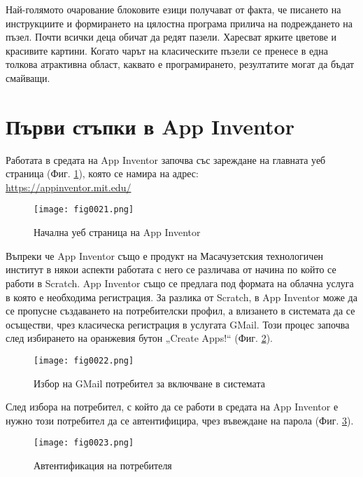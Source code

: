 Най-голямото очарование блоковите езици получават от факта, че писането на инструкциите и формирането на цялостна програма прилича на подреждането на пъзел. Почти всички деца обичат да редят пазели. Харесват ярките цветове и красивите картини. Когато чарът на класическите пъзели се пренесе в една толкова атрактивна област, каквато е програмирането, резултатите могат да бъдат смайващи. 

\section{Първи стъпки в App Inventor}

Работата в средата на App Inventor започва със зареждане на главната уеб страница (Фиг. \ref{fig0021}), която се намира на адрес: \\ \href{https://appinventor.mit.edu/}{https://appinventor.mit.edu/}

\begin{figure}[H]
  \centering
  \texttt{[image: fig0021.png]}
  \caption{Начална уеб страница на App Inventor}
\label{fig0021}
\end{figure}

Въпреки че App Inventor също е продукт на Масачузетския технологичен институт в някои аспекти работата с него се различава от начина по който се работи в Scratch. App Inventor също се предлага под формата на облачна услуга в която е необходима регистрация. За разлика от  Scratch, в App Inventor може да се пропусне създаването на потребителски профил, а влизането в системата да се осъществи, чрез класическа регистрация в услугата GMail. Този процес започва след избирането на оранжевия бутон „Create Apps!“ (Фиг. \ref{fig0022}).

\begin{figure}[H]
  \centering
  \texttt{[image: fig0022.png]}
  \caption{Избор на GMail потребител за включване в системата}
\label{fig0022}
\end{figure}

След избора на потребител, с който да се работи в средата на  App Inventor е нужно този потребител да се автентифицира, чрез въвеждане на парола (Фиг. \ref{fig0023}).

\begin{figure}[H]
  \centering
  \texttt{[image: fig0023.png]}
  \caption{Автентификация на потребителя}
\label{fig0023}
\end{figure}

